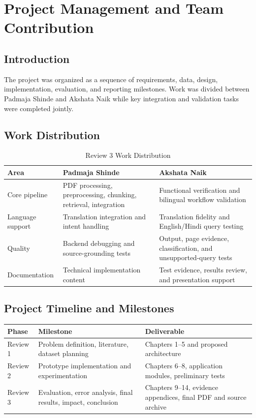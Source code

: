 \chapter{Project Management and Team Contribution}
\label{chap:project_management}

\section{Introduction}
The project was organized as a sequence of requirements, data, design, implementation, evaluation, and reporting milestones. Work was divided between Padmaja Shinde and Akshata Naik while key integration and validation tasks were completed jointly.

\section{Work Distribution}
\begin{table}[H]
\centering
\caption{Review 3 Work Distribution}
\begin{tabular}{|p{4cm}|p{4.5cm}|p{4.5cm}|}
\hline
\textbf{Area} & \textbf{Padmaja Shinde} & \textbf{Akshata Naik} \\
\hline
Core pipeline & PDF processing, preprocessing, chunking, retrieval, integration & Functional verification and bilingual workflow validation \\
\hline
Language support & Translation integration and intent handling & Translation fidelity and English/Hindi query testing \\
\hline
Quality & Backend debugging and source-grounding tests & Output, page evidence, classification, and unsupported-query tests \\
\hline
Documentation & Technical implementation content & Test evidence, results review, and presentation support \\
\hline
\end{tabular}
\end{table}

\section{Project Timeline and Milestones}
\begin{longtable}{|p{3cm}|p{5cm}|p{5cm}|}
\hline
\textbf{Phase} & \textbf{Milestone} & \textbf{Deliverable} \\
\hline
Review 1 & Problem definition, literature, dataset planning & Chapters 1--5 and proposed architecture \\
\hline
Review 2 & Prototype implementation and experimentation & Chapters 6--8, application modules, preliminary tests \\
\hline
Review 3 & Evaluation, error analysis, final results, impact, conclusion & Chapters 9--14, evidence appendices, final PDF and source archive \\
\hline
\end{longtable}

